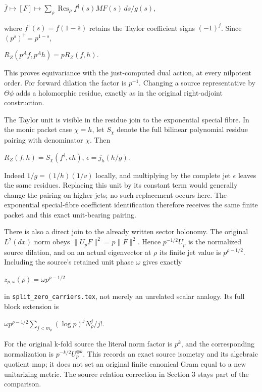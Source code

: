 \(\overline f\mapsto [F]\mapsto\sum_\rho\operatorname{Res}_\rho f^\dagger(s)MF(s)\,ds/g(s)\),

where \(f^\dagger(s)=\overline{f(1-\overline{s})}\) retains the Taylor coefficient signs \((-1)^j\). Since \((p^s)^\dagger=p^{1-s}\),

\(R_Z(p^A f,p^A h)=p R_Z(f,h)\).

This proves equivariance with the just-computed dual action, at every nilpotent order. For forward dilation the factor is \(p^{-1}\). Changing a source representative by \(\Theta \phi\) adds a holomorphic residue, exactly as in the original right-adjoint construction.

The Taylor unit is visible in the residue join to the exponential special fibre. In the monic packet case \(\chi=h\), let \(S_\chi\) denote the full bilinear polynomial residue pairing with denominator \(\chi\). Then

\(R_Z(f,h)=S_\chi(f^\dagger,\epsilon h)\), \(\epsilon=j_h(h/g)\).

Indeed \(1/g=(1/h)(1/v)\) locally, and multiplying by the complete jet \(\epsilon\) leaves the same residues. Replacing this unit by its constant term would generally change the pairing on higher jets; no such replacement occurs here. The exponential special-fibre coefficient identification therefore receives the same finite packet and this exact unit-bearing pairing.

There is also a direct join to the already written sector holonomy. The original \(L^2(dx)\) norm obeys \(\lVert U_pF\rVert^2=p\lVert F\rVert^2\). Hence \(p^{-1/2}U_p\) is the normalized source dilation, and on an actual eigenvector at \(\rho\) its finite jet value is \(p^{\rho-1/2}\). Including the source's retained unit phase \(\omega\) gives exactly

\(z_{p,\omega}(\rho)=\omega p^{\rho-1/2}\)

in \nolinkurl{split_zero_carriers.tex}, not merely an unrelated scalar analogy. Its full block extension is

\(\omega p^{\rho-1/2} \sum_{j<m_\rho}(\log p)^j N_\rho^j/j!\).

For the original k-fold source the literal norm factor is \(p^k\), and the corresponding normalization is \(p^{-k/2}U_p^{\otimes k}\). This records an exact source isometry and its algebraic quotient map; it does not set an original finite canonical Gram equal to a new unitarizing metric. The source relation correction in Section 3 stays part of the comparison.

